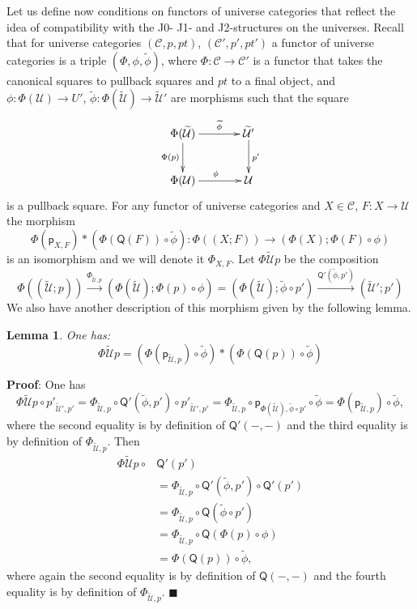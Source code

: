\documentclass[12pt]{article}
\numberwithin{equation}{section}
\newenvironment{eq}{\begin{equation}}{\end{equation}}
\newenvironment{myproof}{{\bf Proof}:}{$\blacksquare$ \vskip 5mm }
\newtheorem{lemma}[proposition]{Lemma}
\newcommand{\llabel}[1]{\label{#1}}
\newcommand{\sr}{\rightarrow}
\newcommand{\lr}{\longrightarrow}
\newcommand{\wt}{\widetilde}
\newcommand{\p}{\mathsf{p}}
\newcommand{\U}{\mathcal{U}}
\newcommand{\Q}{\mathsf{Q}}
\begin{document}
Let us define now conditions on functors of universe categories that reflect
the idea of compatibility with the J0- J1- and J2-structures on the
universes. Recall that for universe categories $({\mathcal C},p,pt)$,
$({\mathcal C}',p',pt')$ a functor of universe categories is a triple
$(\Phi,\phi,\wt{\phi})$, where $\Phi:{\mathcal C}\sr {\mathcal C}'$ is a functor
that takes the canonical squares to pullback squares and $pt$ to a final object,
and $\phi:\Phi(\U)\sr U'$, $\wt{\phi}:\Phi(\wt{\U})\sr \wt{\U}'$ are morphisms
such that the square
%
\begin{eq}\llabel{2015.04.06.eq10}
\begin{xy}
          \xymatrix@C=3pc{ \Phi(\wt{\U}) \ar[r]^-{\wt{\phi}} \ar[d]_{\Phi(p)} &
            \wt{\U}' \ar[d]^{p'}\\ \Phi(\U) \ar[r]^{\phi} & \U }
\end{xy}
\end{eq}%
%
is a pullback square. For any functor of universe categories and $X\in{\mathcal
  C}$, $F:X\sr \U$ the morphism
%
$$\Phi(\p_{X,F})*(\Phi(\Q(F))\circ\wt{\phi}):\Phi((X;F))\sr
(\Phi(X);\Phi(F)\circ\phi)$$
%
is an isomorphism and we will denote it $\Phi_{X,F}$. Let $\Phi\wt{\U}p$ be the
composition
%
$$\Phi((\wt{\U};p)) \stackrel{\Phi_{\wt{\U},p}}{\lr} (\Phi(\wt{\U});\Phi(p)\circ
\phi)=(\Phi(\wt{\U});\wt{\phi}\circ p')\stackrel{\Q'(\wt{\phi},p')}{\lr}
(\wt{\U}';p')$$
%
We also have another description of this morphism given by the following lemma.
%
\begin{lemma}
\llabel{2015.04.10.l5} One has:
%
$$\Phi\wt{\U}p=(\Phi(\p_{\wt{\U},p})\circ\wt{\phi})*(\Phi(\Q(p))\circ\wt{\phi})$$
%
\end{lemma}
%
\begin{myproof}
One has
%
$$\Phi\wt{\U}p\circ p'_{\wt{\U}',p'}=\Phi_{\wt{\U},p}\circ \Q'(\wt{\phi},p')\circ
p'_{\wt{\U}',p'} =\Phi_{\wt{\U},p}\circ \p_{\Phi(\wt{\U}),\wt{\phi}\circ
  p'}\circ\wt{\phi}=\Phi(\p_{\wt{\U},p})\circ \wt{\phi},$$
%
where the second equality is by definition of $\Q'(-,-)$ and the third equality
is by definition of $\Phi_{\wt{\U},p}$. Then
%
\begin{align*}
  \Phi\wt{\U}p\circ & \Q'(p') \\
    & = \Phi_{\wt{\U},p}\circ \Q'(\wt{\phi},p')\circ \Q'(p') \\
    & = \Phi_{\wt{\U},p}\circ \Q(\wt{\phi}\circ p') \\
    & = \Phi_{\wt{\U},p}\circ \Q(\Phi(p)\circ \phi) \\
    & = \Phi(\Q(p))\circ \wt{\phi},
\end{align*}
%
where again the second equality is by definition of $\Q(-,-)$ and the fourth
equality is by definition of $\Phi_{\wt{\U},p}$.
\end{myproof}
\end{document}
